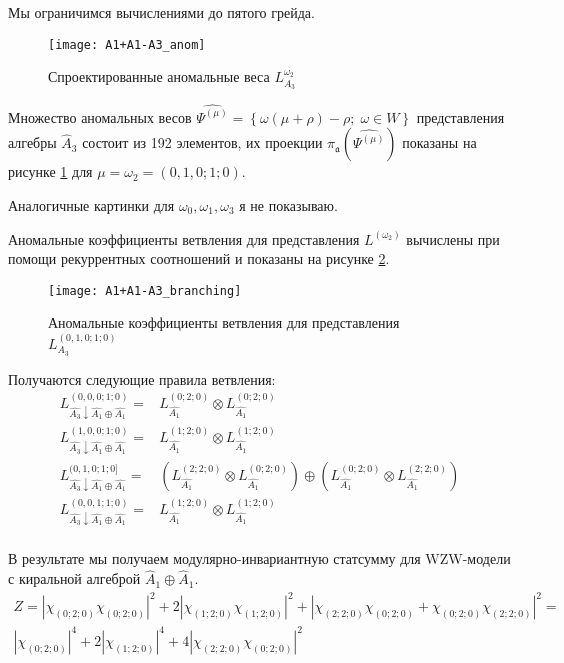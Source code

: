 Мы ограничимся вычислениями до пятого грейда.
\begin{figure}[h!tb]
  \texttt{[image: A1+A1-A3\_anom]}
  \caption{Спроектированные аномальные веса $L^{\omega_2}_{A_3}$}
  \label{fig:A1+A1-A3_anom}
\end{figure}

Множество аномальных весов  $\widehat{\Psi^{(\mu)}}=\left\{\omega(\mu+\rho)-\rho;\; \omega\in
  W\right\}$ представления алгебры $\hat{A}_3$ состоит из 192 элементов, их проекции
$\pi_{\mathfrak{a}}\left(\widehat{\Psi^{(\mu)}}\right)$ показаны на рисунке  \ref{fig:A1+A1-A3_anom}
для $\mu=\omega_2=(0,1,0;1;0)$.

Аналогичные картинки для $\omega_0, \omega_1,\omega_3$ я не показываю.

Аномальные коэффициенты ветвления для представления  $L^{(\omega_2)}$ вычислены при помощи
рекуррентных соотношений и показаны на рисунке \ref{fig:A1+A1-A3_branching}. 
\begin{figure}[h!tb]
  \hspace*{-2cm}\texttt{[image: A1+A1-A3\_branching]}
  \caption{Аномальные коэффициенты ветвления для представления $L^{(0,1,0;1;0)}_{A_3}$}
  \label{fig:A1+A1-A3_branching}
\end{figure}

Получаются следующие правила ветвления:
 \begin{equation}
   \label{eq:39}
   \begin{array}{ll}
     L^{(0,0,0;1;0)}_{\hat{A_3}\downarrow \hat{A_1}\oplus \hat{A_1}}= & L_{\hat{A_1}}^{(0;2;0)}\otimes L_{\hat{A_1}}^{(0;2;0)} \\
     L^{(1,0,0;1;0)}_{\hat{A_3}\downarrow \hat{A_1}\oplus \hat{A_1}}= & L_{\hat{A_1}}^{(1;2;0)}\otimes L_{\hat{A_1}}^{(1;2;0)} \\
     L^{(0,1,0;1;0]}_{\hat{A_3}\downarrow \hat{A_1}\oplus \hat{A_1}}= & \left( L_{\hat{A_1}}^{(2;2;0)}\otimes L_{\hat{A_1}}^{(0;2;0)}\right) \oplus \left( L_{\hat{A_1}}^{(0;2;0)}\otimes L_{\hat{A_1}}^{(2;2;0)}\right) \\
     L^{(0,0,1;1;0)}_{\hat{A_3}\downarrow \hat{A_1}\oplus \hat{A_1}}= & L_{\hat{A_1}}^{(1;2;0)}\otimes L_{\hat{A_1}}^{(1;2;0)} \\     
   \end{array}
 \end{equation}

В результате мы получаем модулярно-инвариантную статсумму для WZW-модели с киральной алгеброй $\hat{A}_1\oplus \hat{A}_1$.
\begin{multline}
  \label{eq:40}
  Z=\left|\chi_{(0;2;0)}\chi_{(0;2;0)}\right|^2+2\left|\chi_{(1;2;0)}\chi_{(1;2;0)}\right|^2+ \left|\chi_{(2;2;0)}\chi_{(0;2;0)}+\chi_{(0;2;0)}\chi_{(2;2;0)}\right|^2=\\
  \left|\chi_{(0;2;0)}\right|^4+2\left|\chi_{(1;2;0)}\right|^4+ 4\left|\chi_{(2;2;0)}\chi_{(0;2;0)}\right|^2
\end{multline}

